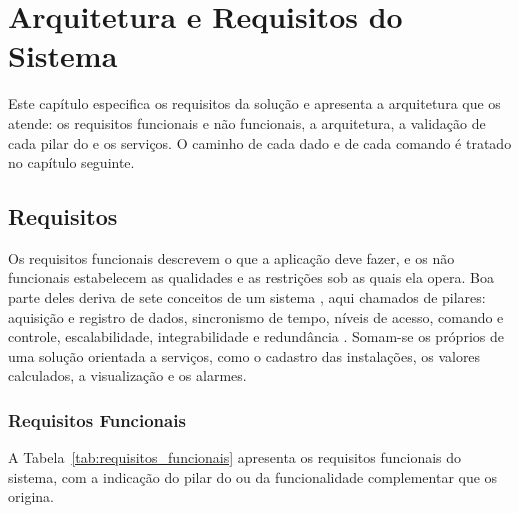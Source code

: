 \newpage
\section{Arquitetura e Requisitos do Sistema}

\par Este capítulo especifica os requisitos da solução e apresenta a arquitetura que os atende: os requisitos funcionais e não funcionais, a arquitetura, a validação de cada pilar do  e os serviços. O caminho de cada dado e de cada comando é tratado no capítulo seguinte.

\subsection{Requisitos}

\par Os requisitos funcionais descrevem o que a aplicação deve fazer, e os não funcionais estabelecem as qualidades e as restrições sob as quais ela opera. Boa parte deles deriva de sete conceitos de um sistema , aqui chamados de pilares: aquisição e registro de dados, sincronismo de tempo, níveis de acesso, comando e controle, escalabilidade, integrabilidade e redundância \cite{ZANGHI2019_SCADA_CONCEITOS}. Somam-se os próprios de uma solução orientada a serviços, como o cadastro das instalações, os valores calculados, a visualização e os alarmes.

\subsubsection{Requisitos Funcionais}

\par A Tabela~\ref{tab:requisitos_funcionais} apresenta os requisitos funcionais do sistema, com a indicação do pilar do  ou da funcionalidade complementar que os origina.

